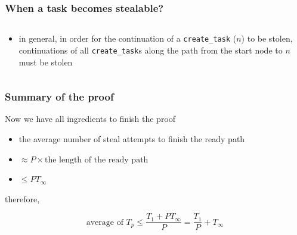 \documentclass[12pt,dvipdfmx]{beamer}
\newcommand{\ao}[1]{{\color{blue}#1}}
\begin{document}
\begin{frame}
\frametitle{When a task becomes stealable?}

\begin{columns}
\begin{column}{0.7\textwidth}

\begin{itemize}

\item<1-> in general, in order for the continuation of
  a {\tt create\_task} ($n$) to be stolen, 
  continuations of all {\tt create\_task}s
  along the path from the start node to $n$
  must be stolen


\end{itemize}

\end{column}
\begin{column}{0.3\textwidth}
\def\svgwidth{0.6\textwidth}{\scriptsize}
\end{column}
\end{columns}


\end{frame}

\begin{frame}
\frametitle{Summary of the proof}
Now we have all ingredients to finish the proof

\begin{itemize}
\item<1-> [] the average number of steal attempts to finish the ready path
\item<2-> [] $\approx P \times \mbox{the length of the ready path}$
\item<3-> [] $\leq P T_\infty$
\end{itemize}

therefore, 

\[ \mbox{average of } T_p \leq \frac{T_1 + P T_\infty}{P} = \frac{T_1}{P} + T_\infty \]

\end{frame}
\end{document}
